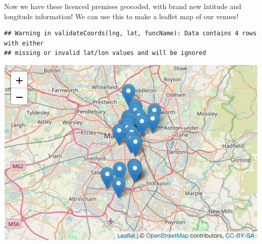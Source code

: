 \documentclass[
]{book}
\newenvironment{Shaded}{\begin{snugshade}}{\end{snugshade}}
\newcommand{\AttributeTok}[1]{\textcolor[rgb]{0.77,0.63,0.00}{#1}}
\newcommand{\CommentTok}[1]{\textcolor[rgb]{0.56,0.35,0.01}{\textit{#1}}}
\newcommand{\FunctionTok}[1]{\textcolor[rgb]{0.00,0.00,0.00}{#1}}
\newcommand{\NormalTok}[1]{#1}
\newcommand{\OtherTok}[1]{\textcolor[rgb]{0.56,0.35,0.01}{#1}}
\newcommand{\SpecialCharTok}[1]{\textcolor[rgb]{0.00,0.00,0.00}{#1}}
\begin{document}
Now we have these licenced premises geocoded, with brand new latitude and longitude information! We can use this to make a leaflet map of our venues!

\begin{Shaded}
\end{Shaded}

\begin{verbatim}
## Warning in validateCoords(lng, lat, funcName): Data contains 4 rows with either
## missing or invalid lat/lon values and will be ignored
\end{verbatim}

\includegraphics{crime_mapping_files/figure-latex/unnamed-chunk-58-1.pdf}
\end{document}

